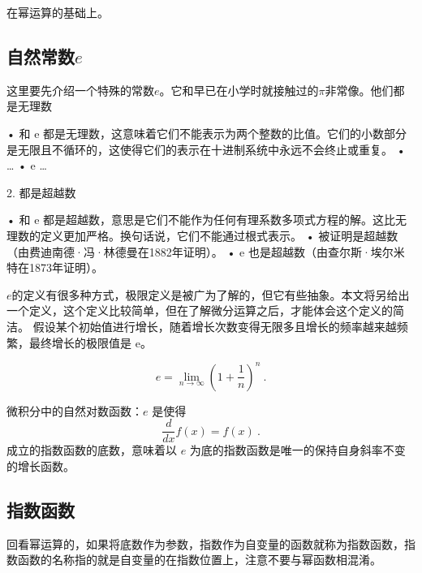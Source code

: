 
\begin{issues}
\issueDraft
\end{issues}


在幂运算的基础上。

\subsection{自然常数$e$}

这里要先介绍一个特殊的常数$e$。它和早已在小学时就接触过的$\pi$非常像。他们都是无理数

	•	\pi 和 e 都是无理数，这意味着它们不能表示为两个整数的比值。它们的小数部分是无限且不循环的，这使得它们的表示在十进制系统中永远不会终止或重复。
	•	\pi {}\ldots
	•	e \ldots

2. 都是超越数

	•	\pi 和 e 都是超越数，意思是它们不能作为任何有理系数多项式方程的解。这比无理数的定义更加严格。换句话说，它们不能通过根式表示。
	•	\pi 被证明是超越数（由费迪南德·冯·林德曼在1882年证明）。
	•	e 也是超越数（由查尔斯·埃尔米特在1873年证明）。

$e$的定义有很多种方式，极限定义是被广为了解的，但它有些抽象。本文将另给出一个定义，这个定义比较简单，但在了解微分运算之后，才能体会这个定义的简洁。
假设某个初始值进行增长，随着增长次数变得无限多且增长的频率越来越频繁，最终增长的极限值是 e。

\begin{equation}
e = \lim_{n \to \infty} \left( 1 + \frac{1}{n} \right)^n~.
\end{equation}


微积分中的自然对数函数：$e$ 是使得
\begin{equation}
\frac{d}{dx} f(x) = f(x)~.
\end{equation}
成立的指数函数的底数，意味着以 $e$ 为底的指数函数是唯一的保持自身斜率不变的增长函数。

\subsection{指数函数}

回看幂运算的，如果将底数作为参数，指数作为自变量的函数就称为指数函数，指数函数的名称指的就是自变量的在指数位置上，注意不要与幂函数相混淆。

